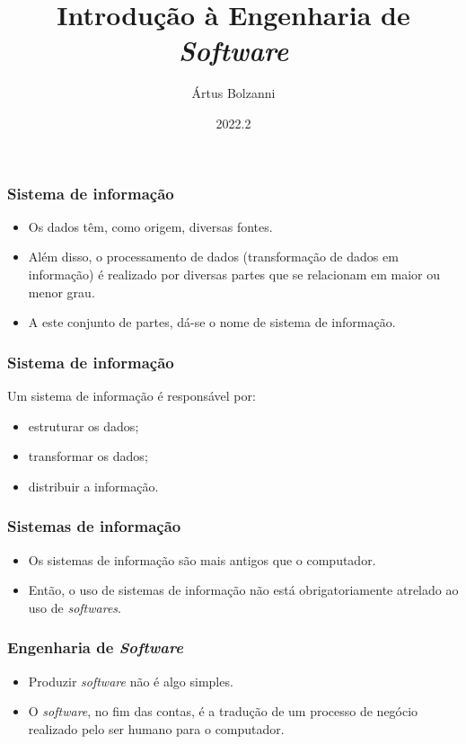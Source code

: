 \documentclass[11pt]{beamer}
\title{Introdução à Engenharia de \textit{Software}}
\author{Ártus Bolzanni}
\date{2022.2}
\begin{document}
    \begin{frame}[plain]
        \titlepage
    \end{frame}

    \begin{frame}
      \frametitle{Sistema de informação}
      \begin{itemize}
        \item Os dados têm, como origem, diversas fontes.
        \item Além disso, o processamento de dados (transformação de dados em informação) é realizado por diversas partes que se relacionam em maior ou menor grau.
        \item A este conjunto de partes, dá-se o nome de sistema de informação.
      \end{itemize}
    \end{frame}

    \begin{frame}
      \frametitle{Sistema de informação}
      Um sistema de informação é responsável por:
      \begin{itemize}
        \item estruturar os dados;
        \item transformar os dados;
        \item distribuir a informação.
      \end{itemize}
    \end{frame}

    \begin{frame}
      \frametitle{Sistemas de informação}
      \begin{itemize}
        \item Os sistemas de informação são mais antigos que o computador.
        \item Então, o uso de sistemas de informação não está obrigatoriamente atrelado ao uso de \textit{softwares}.
      \end{itemize}
    \end{frame}

    \begin{frame}
      \frametitle{Engenharia de \textit{Software}}
      \begin{itemize}
        \item Produzir \textit{software} não é algo simples.
        \item O \textit{software}, no fim das contas, é a tradução de um processo de negócio realizado pelo ser humano para o computador.
      \end{itemize}
    \end{frame}
    
\end{document}
